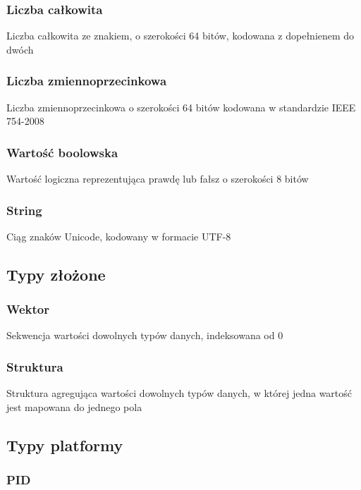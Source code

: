 \subsubsection{Liczba całkowita}
\label{viuact_spec_datatypes_simple_integer}

Liczba całkowita ze znakiem, o szerokości 64 bitów, kodowana z dopełnienem do dwóch

\subsubsection{Liczba zmiennoprzecinkowa}

Liczba zmiennoprzecinkowa o szerokości 64 bitów kodowana w standardzie IEEE 754-2008

\subsubsection{Wartość boolowska}

Wartość logiczna reprezentująca prawdę lub fałsz o szerokości 8 bitów

\subsubsection{String}

Ciąg znaków Unicode, kodowany w formacie UTF-8

\subsection{Typy złożone}

\subsubsection{Wektor}

Sekwencja wartości dowolnych typów danych, indeksowana od 0

\subsubsection{Struktura}

Struktura agregująca wartości dowolnych typów danych, w której jedna
wartość jest mapowana do jednego pola

\subsection{Typy platformy}

\subsubsection{PID}

